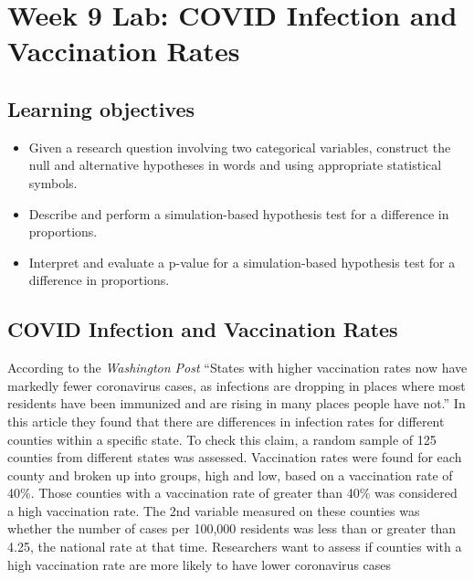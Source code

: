 \documentclass[
]{report}
\begin{document}
\hypertarget{week-9-lab-covid-infection-and-vaccination-rates}{%
\section{Week 9 Lab: COVID Infection and Vaccination Rates}\label{week-9-lab-covid-infection-and-vaccination-rates}}


\hypertarget{learning-objectives-14}{%
\subsection{Learning objectives}\label{learning-objectives-14}}

\begin{itemize}
\item
  Given a research question involving two categorical variables, construct the null and alternative hypotheses
  in words and using appropriate statistical symbols.
\item
  Describe and perform a simulation-based hypothesis test for a difference in proportions.
\item
  Interpret and evaluate a p-value for a simulation-based hypothesis test for a difference in proportions.
\end{itemize}

\hypertarget{covid-infection-and-vaccination-rates}{%
\subsection{COVID Infection and Vaccination Rates}\label{covid-infection-and-vaccination-rates}}

According to the \emph{Washington Post} ``States with higher vaccination rates now have markedly fewer coronavirus cases, as infections are dropping in places where most residents have been immunized and are rising in many places people have not.'' In this article they found that there are differences in infection rates for different counties within a specific state. To check this claim, a random sample of 125 counties from different states was assessed. Vaccination rates were found for each county and broken up into groups, high and low, based on a vaccination rate of 40\%. Those counties with a vaccination rate of greater than 40\% was considered a high vaccination rate. The 2nd variable measured on these counties was whether the number of cases per 100,000 residents was less than or greater than 4.25, the national rate at that time. Researchers want to assess if counties with a high vaccination rate are more likely to have lower coronavirus cases
\end{document}
